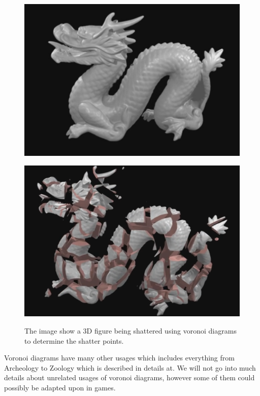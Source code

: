 \begin{figure}[H]
	\begin{minipage}[b]{.49\linewidth}
		\includegraphics[width=0.95\linewidth]{img/VoronoiShatter1}
		\label{fig:3a}
	\end{minipage}
	\begin{minipage}[b]{.49\linewidth}
		\includegraphics[width=0.95\linewidth]{img/VoronoiShatter2}
		\label{fig:3b}
	\end{minipage}
	\centering
	\caption{The image show a 3D figure being shattered using voronoi diagrams to determine the shatter points.}
	\label{fig:VoronoiShatering}
\end{figure}

Voronoi diagrams have many other usages which includes everything from Archeology to Zoology which is described in details at\cite{VoronoiDiagrams:Applications}. We will not go into much details about unrelated usages of voronoi diagrams, however some of them could possibly be adapted upon in games. 

